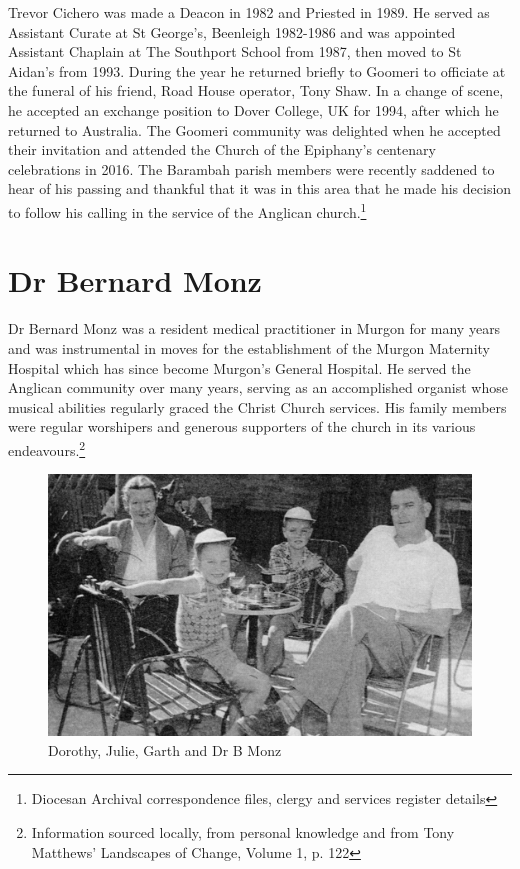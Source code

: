 Trevor Cichero was made a Deacon in 1982 and Priested in 1989. He served as Assistant Curate at St George's, Beenleigh 1982-1986 and was appointed Assistant Chaplain at The Southport School from 1987, then moved to St Aidan's from 1993. During the year he returned briefly to Goomeri to officiate at the funeral of his friend, Road House operator, Tony Shaw. In a change of scene, he accepted an exchange position to Dover College, UK for 1994, after which he returned to Australia. The Goomeri community was delighted when he accepted their invitation and attended the Church of the Epiphany's centenary celebrations in 2016. The Barambah parish members were recently saddened to hear of his passing and thankful that it was in this area that he made his decision to follow his calling in the service of the Anglican church.\footnote{Diocesan Archival correspondence files, clergy and services register details}


\section{Dr Bernard Monz}



Dr Bernard Monz was a resident medical practitioner in Murgon for many years and was instrumental in moves for the establishment of the Murgon Maternity Hospital which has since become Murgon's General Hospital. He served the Anglican community over many years, serving as an accomplished organist whose musical abilities regularly graced the Christ Church services. His family members were regular worshipers and generous supporters of the church in its various endeavours.\footnote{Information sourced locally, from personal knowledge and from Tony Matthews' Landscapes of Change, Volume 1, p. 122}








\begin{figure}
\begin{center}
\includegraphics[width=1.\linewidth,center]{../images/monz.jpg}
\caption{Dorothy, Julie, Garth and Dr B Monz}
\end{center}
\end{figure}


